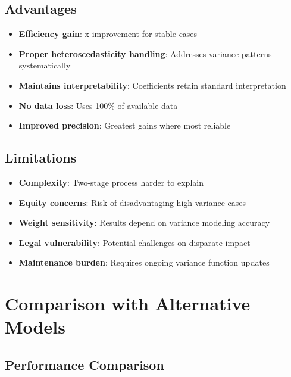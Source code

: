 \subsection{Advantages}

\begin{itemize}
    \item \textbf{Efficiency gain}: \ModelFourEfficiencyRatio{}x improvement for stable cases
    \item \textbf{Proper heteroscedasticity handling}: Addresses variance patterns systematically
    \item \textbf{Maintains interpretability}: Coefficients retain standard interpretation
    \item \textbf{No data loss}: Uses 100\% of available data
    \item \textbf{Improved precision}: Greatest gains where most reliable
\end{itemize}

\subsection{Limitations}

\begin{itemize}
    \item \textbf{Complexity}: Two-stage process harder to explain
    \item \textbf{Equity concerns}: Risk of disadvantaging high-variance cases
    \item \textbf{Weight sensitivity}: Results depend on variance modeling accuracy
    \item \textbf{Legal vulnerability}: Potential challenges on disparate impact
    \item \textbf{Maintenance burden}: Requires ongoing variance function updates
\end{itemize}

\section{Comparison with Alternative Models}

\subsection{Performance Comparison}

